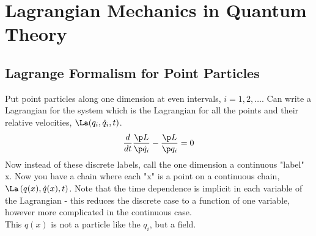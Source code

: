 \documentclass[a4paper, 11pt, normalem]{report}
\begin{document}
\chapter{Lagrangian Mechanics in Quantum Theory}
\section{Lagrange Formalism for Point Particles}
Put point particles along one dimension at even intervals, $i=1,2,\dots$.
Can write a Lagrangian for the system which is the Lagrangian for all the points and their relative velocities, $\La(q_i,\dot{q}_i,t)$.
\begin{align}
    \frac{d}{dt}\frac{\p L}{\p \dot{q}_i} - \frac{\p L}{\p q_i} = 0
\end{align}
Now instead of these discrete labels, call the one dimension a continuous "label" x.
Now you have a chain where each "x" is a point on a continuous chain, $\La\left(q(x),\dot{q}(x),t\right)$.
Note that the time dependence is implicit in each variable of the Lagrangian - this reduces the discrete case to a function of one variable, however more complicated in the continuous case. \\
This $q(x)$ is not a particle like the $q_i$, but a field.
\end{document}
